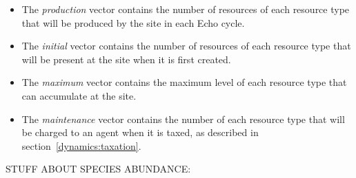 \begin{itemize}
\item
The {\em production\/} vector contains the number of resources of each
resource type that will be produced by the site in each Echo cycle.

\item
The {\em initial\/} vector contains the number of resources of each
resource type that will be present at the site when it is first
created.

\item
The {\em maximum\/} vector contains the maximum level of each resource
type that can accumulate at the site.

\item
The {\em maintenance\/} vector contains the number of each resource
type that will be charged to an agent when it is taxed, as described
in section~\ref{dynamics:taxation}.
\end{itemize}










STUFF ABOUT SPECIES ABUNDANCE:


